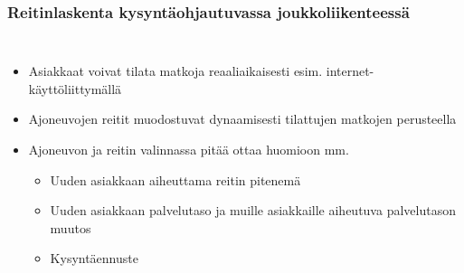 \documentclass{beamer}
\begin{document}
\begin{frame}
  \frametitle{Reitinlaskenta kysyntäohjautuvassa joukkoliikenteessä}   %
  \begin{columns}[c]
  \column{3.5in}  %
  \begin{itemize}
    \item
    Asiakkaat voivat tilata matkoja reaaliaikaisesti esim. internet-käyttöliittymällä
    \item
    Ajoneuvojen reitit muodostuvat dynaamisesti tilattujen matkojen perusteella
  \item
 Ajoneuvon ja reitin valinnassa pitää ottaa huomioon mm.
 \begin{itemize}
  \item 
  Uuden asiakkaan aiheuttama reitin pitenemä
  \item
  Uuden asiakkaan palvelutaso ja muille asiakkaille aiheutuva palvelutason muutos
  \item
  Kysyntäennuste
 \end{itemize}

  \end{itemize}
    \column{1.5in}
\centering


\end{columns}
\end{frame}
\end{document}
